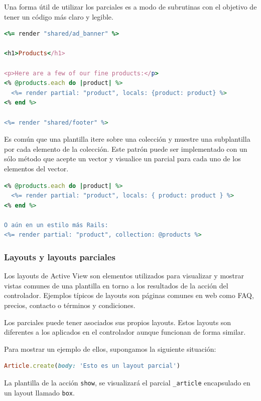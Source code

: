 Una forma útil de utilizar los parciales es a modo de subrutinas con el objetivo de tener un código más claro y legible.

\begin{lstlisting}[language=Ruby]
<%= render "shared/ad_banner" %>
 
<h1>Products</h1>
 
<p>Here are a few of our fine products:</p>
<% @products.each do |product| %>
  <%= render partial: "product", locals: {product: product} %>
<% end %>
 
<%= render "shared/footer" %>
\end{lstlisting}

Es común que una plantilla itere sobre una colección y muestre una subplantilla por cada elemento de la colección. Este patrón puede ser implementado con un sólo método que acepte un vector y visualice un parcial para cada uno de los elementos del vector.

\begin{lstlisting}[language=Ruby]
<% @products.each do |product| %>
  <%= render partial: "product", locals: { product: product } %>
<% end %>

O aún en un estilo más Rails:
<%= render partial: "product", collection: @products %>
\end{lstlisting}


\subsubsection{Layouts y layouts parciales}
Los layouts de Active View son elementos utilizados para visualizar y mostrar vistas comunes de una plantilla en torno a los resultados de la acción del controlador.
Ejemplos típicos de layouts son páginas comunes en web como FAQ, precios, contacto o términos y condiciones.

Los parciales puede tener asociados sus propios layouts. Estos layouts son diferentes a los aplicados en el controlador aunque funcionan de forma similar.

Para mostrar un ejemplo de ellos, supongamos la siguiente situación:

\begin{lstlisting}[language=Ruby]
Article.create(body: 'Esto es un layout parcial')
\end{lstlisting}

La plantilla de la acción \texttt{show}, se visualizará el parcial \texttt{\_article} encapsulado en un layout llamado \texttt{box}.

